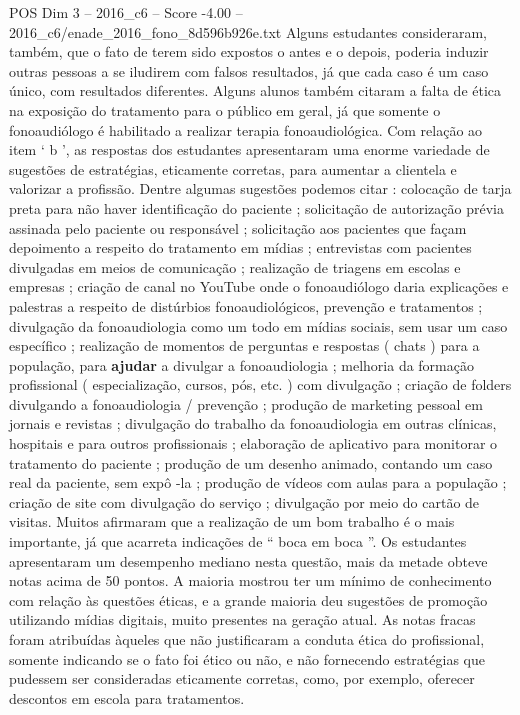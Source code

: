 \begin{textsample}{POS Dim 3 – 2016\_c6 – Score -4.00 – 2016\_c6/enade\_2016\_fono\_8d596b926e.txt}
Alguns estudantes consideraram, também, que o fato de terem sido expostos o antes e o depois, poderia induzir outras pessoas a se iludirem com falsos resultados, já que cada caso é um caso único, com resultados diferentes.
Alguns alunos também citaram a falta de ética na exposição do tratamento para o público em geral, já que somente o fonoaudiólogo é habilitado a realizar terapia fonoaudiológica.
Com relação ao item ‘ b ’, as respostas dos estudantes apresentaram uma enorme variedade de sugestões de estratégias, eticamente corretas, para aumentar a clientela e valorizar a profissão.
Dentre algumas sugestões podemos citar : colocação de tarja preta para não haver identificação do paciente ; solicitação de autorização prévia assinada pelo paciente ou responsável ; solicitação aos pacientes que façam depoimento a respeito do tratamento em mídias ; entrevistas com pacientes divulgadas em meios de comunicação ; realização de triagens em escolas e empresas ; criação de canal no YouTube onde o fonoaudiólogo daria explicações e palestras a respeito de distúrbios fonoaudiológicos, prevenção e tratamentos ; divulgação da fonoaudiologia como um todo em mídias sociais, sem usar um caso específico ; realização de momentos de perguntas e respostas ( chats ) para a população, para \textbf{ajudar} a divulgar a fonoaudiologia ; melhoria da formação profissional ( especialização, cursos, pós, etc. ) com divulgação ; criação de folders divulgando a fonoaudiologia / prevenção ; produção de marketing pessoal em jornais e revistas ; divulgação do trabalho da fonoaudiologia em outras clínicas, hospitais e para outros profissionais ; elaboração de aplicativo para monitorar o tratamento do paciente ; produção de um desenho animado, contando um caso real da paciente, sem expô -la ; produção de vídeos com aulas para a população ; criação de site com divulgação do serviço ; divulgação por meio do cartão de visitas.
Muitos afirmaram que a realização de um bom trabalho é o mais importante, já que acarreta indicações de “ boca em boca ”.
Os estudantes apresentaram um desempenho mediano nesta questão, mais da metade obteve notas acima de 50 pontos.
A maioria mostrou ter um mínimo de conhecimento com relação às questões éticas, e a grande maioria deu sugestões de promoção utilizando mídias digitais, muito presentes na geração atual.
As notas fracas foram atribuídas àqueles que não justificaram a conduta ética do profissional, somente indicando se o fato foi ético ou não, e não fornecendo estratégias que pudessem ser consideradas eticamente corretas, como, por exemplo, oferecer descontos em escola para tratamentos.

\end{textsample}
